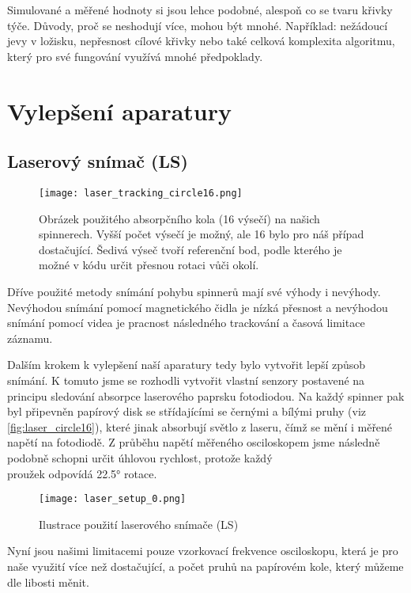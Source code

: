 Simulované a měřené hodnoty si jsou lehce podobné, alespoň co se tvaru křivky týče. Důvody, proč se neshodují více, mohou být mnohé. Například: nežádoucí jevy v ložisku, nepřesnost cílové křivky nebo také celková komplexita algoritmu, který pro své fungování využívá mnohé předpoklady.


\clearpage

\section{Vylepšení aparatury}

\subsection{Laserový snímač (LS)}

\begin{wrapfigure}{r}{0.45\textwidth}
    \texttt{[image: laser\_tracking\_circle16.png]}
    \centering
    \caption[Obrázek použitého absorpčního kola]{Obrázek použitého absorpčního kola (16 výsečí) na našich spinnerech. Vyšší počet výsečí je možný, ale 16 bylo pro náš případ dostačující. Šedivá výseč tvoří referenční bod, podle kterého je možné v kódu určit přesnou rotaci vůči okolí. }
    \label{fig:laser_circle16}
\end{wrapfigure}

Dříve použité metody snímání pohybu spinnerů mají své výhody i nevýhody. Nevýhodou snímání pomocí magnetického čidla je nízká přesnost a nevýhodou snímání pomocí videa je pracnost následného trackování a časová limitace záznamu.

Dalším krokem k vylepšení naší aparatury tedy bylo vytvořit lepší způsob snímání. K tomuto jsme se rozhodli vytvořit vlastní senzory postavené na principu sledování absorpce laserového paprsku fotodiodou. Na každý spinner pak byl připevněn papírový disk  se střídajícími se černými a bílými pruhy (viz \autoref{fig:laser_circle16}), které jinak absorbují světlo z laseru, čímž se mění i měřené napětí na fotodiodě. Z průběhu napětí měřeného osciloskopem jsme následně podobně schopni určit úhlovou rychlost, protože každý \\ proužek odpovídá 22.5° rotace.

\begin{wrapfigure}{r}{0.45\textwidth}
    \texttt{[image: laser\_setup\_0.png]}
    \centering
    \caption{Ilustrace použití laserového snímače (LS)}
    \label{fig:LS_diode}
\end{wrapfigure}
Nyní jsou našimi limitacemi pouze vzorkovací frekvence osciloskopu, která je pro naše využití více než dostačující, a počet pruhů na papírovém kole, který můžeme dle libosti měnit.

